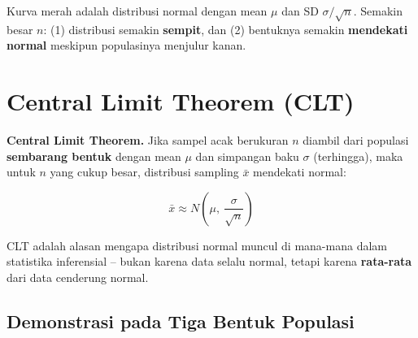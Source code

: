 \documentclass[
  indonesian,
  letterpaper,
]{book}
\begin{document}
Kurva merah adalah distribusi normal dengan mean \(\mu\) dan SD
\(\sigma/\sqrt{n}\). Semakin besar \(n\): (1) distribusi semakin
\textbf{sempit}, dan (2) bentuknya semakin \textbf{mendekati normal}
meskipun populasinya menjulur kanan.

\section{Central Limit Theorem (CLT)}\label{central-limit-theorem-clt}

\textbf{Central Limit Theorem.} Jika sampel acak berukuran \(n\) diambil
dari populasi \textbf{sembarang bentuk} dengan mean \(\mu\) dan
simpangan baku \(\sigma\) (terhingga), maka untuk \(n\) yang cukup
besar, distribusi sampling \(\bar{x}\) mendekati normal:

\[\bar{x} \approx N\left(\mu,\ \frac{\sigma}{\sqrt{n}}\right)\]

CLT adalah alasan mengapa distribusi normal muncul di mana-mana dalam
statistika inferensial -- bukan karena data selalu normal, tetapi karena
\textbf{rata-rata} dari data cenderung normal.

\subsection{Demonstrasi pada Tiga Bentuk
Populasi}\label{demonstrasi-pada-tiga-bentuk-populasi}
\end{document}
